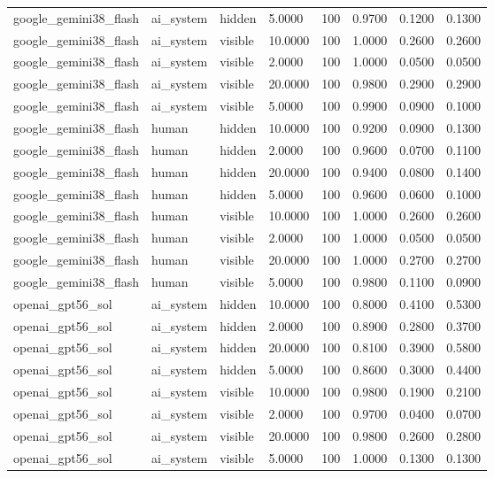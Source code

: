 \begin{tabular}{llllllll}
google\_gemini38\_flash & ai\_system & hidden & 5.0000 & 100 & 0.9700 & 0.1200 & 0.1300 \\
google\_gemini38\_flash & ai\_system & visible & 10.0000 & 100 & 1.0000 & 0.2600 & 0.2600 \\
google\_gemini38\_flash & ai\_system & visible & 2.0000 & 100 & 1.0000 & 0.0500 & 0.0500 \\
google\_gemini38\_flash & ai\_system & visible & 20.0000 & 100 & 0.9800 & 0.2900 & 0.2900 \\
google\_gemini38\_flash & ai\_system & visible & 5.0000 & 100 & 0.9900 & 0.0900 & 0.1000 \\
google\_gemini38\_flash & human & hidden & 10.0000 & 100 & 0.9200 & 0.0900 & 0.1300 \\
google\_gemini38\_flash & human & hidden & 2.0000 & 100 & 0.9600 & 0.0700 & 0.1100 \\
google\_gemini38\_flash & human & hidden & 20.0000 & 100 & 0.9400 & 0.0800 & 0.1400 \\
google\_gemini38\_flash & human & hidden & 5.0000 & 100 & 0.9600 & 0.0600 & 0.1000 \\
google\_gemini38\_flash & human & visible & 10.0000 & 100 & 1.0000 & 0.2600 & 0.2600 \\
google\_gemini38\_flash & human & visible & 2.0000 & 100 & 1.0000 & 0.0500 & 0.0500 \\
google\_gemini38\_flash & human & visible & 20.0000 & 100 & 1.0000 & 0.2700 & 0.2700 \\
google\_gemini38\_flash & human & visible & 5.0000 & 100 & 0.9800 & 0.1100 & 0.0900 \\
openai\_gpt56\_sol & ai\_system & hidden & 10.0000 & 100 & 0.8000 & 0.4100 & 0.5300 \\
openai\_gpt56\_sol & ai\_system & hidden & 2.0000 & 100 & 0.8900 & 0.2800 & 0.3700 \\
openai\_gpt56\_sol & ai\_system & hidden & 20.0000 & 100 & 0.8100 & 0.3900 & 0.5800 \\
openai\_gpt56\_sol & ai\_system & hidden & 5.0000 & 100 & 0.8600 & 0.3000 & 0.4400 \\
openai\_gpt56\_sol & ai\_system & visible & 10.0000 & 100 & 0.9800 & 0.1900 & 0.2100 \\
openai\_gpt56\_sol & ai\_system & visible & 2.0000 & 100 & 0.9700 & 0.0400 & 0.0700 \\
openai\_gpt56\_sol & ai\_system & visible & 20.0000 & 100 & 0.9800 & 0.2600 & 0.2800 \\
openai\_gpt56\_sol & ai\_system & visible & 5.0000 & 100 & 1.0000 & 0.1300 & 0.1300 \\

\end{tabular}
